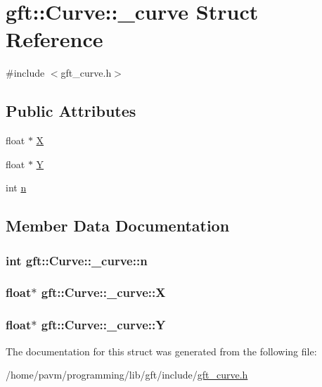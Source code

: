 \hypertarget{structgft_1_1Curve_1_1__curve}{\section{gft\-:\-:Curve\-:\-:\-\_\-curve Struct Reference}
\label{structgft_1_1Curve_1_1__curve}
}


{\ttfamily \#include $<$gft\-\_\-curve.\-h$>$}

\subsection*{Public Attributes}
\begin{DoxyCompactItemize}
\item 
float $\ast$ \hyperlink{structgft_1_1Curve_1_1__curve_a2e66f87762fc4f9f34b92ae2bb832c06}{X}
\item 
float $\ast$ \hyperlink{structgft_1_1Curve_1_1__curve_a41af9aa85ad177abd58f933208fc90b7}{Y}
\item 
int \hyperlink{structgft_1_1Curve_1_1__curve_a8720eb6b07fed54175eac0a2776fa1d3}{n}
\end{DoxyCompactItemize}


\subsection{Member Data Documentation}
\hypertarget{structgft_1_1Curve_1_1__curve_a8720eb6b07fed54175eac0a2776fa1d3}{
\subsubsection[{n}]{\setlength{\rightskip}{0pt plus 5cm}int gft\-::\-Curve\-::\-\_\-curve\-::n}}\label{structgft_1_1Curve_1_1__curve_a8720eb6b07fed54175eac0a2776fa1d3}
\hypertarget{structgft_1_1Curve_1_1__curve_a2e66f87762fc4f9f34b92ae2bb832c06}{
\subsubsection[{X}]{\setlength{\rightskip}{0pt plus 5cm}float$\ast$ gft\-::\-Curve\-::\-\_\-curve\-::\-X}}\label{structgft_1_1Curve_1_1__curve_a2e66f87762fc4f9f34b92ae2bb832c06}
\hypertarget{structgft_1_1Curve_1_1__curve_a41af9aa85ad177abd58f933208fc90b7}{
\subsubsection[{Y}]{\setlength{\rightskip}{0pt plus 5cm}float$\ast$ gft\-::\-Curve\-::\-\_\-curve\-::\-Y}}\label{structgft_1_1Curve_1_1__curve_a41af9aa85ad177abd58f933208fc90b7}


The documentation for this struct was generated from the following file\-:\begin{DoxyCompactItemize}
\item 
/home/pavm/programming/lib/gft/include/\hyperlink{gft__curve_8h}{gft\-\_\-curve.\-h}\end{DoxyCompactItemize}
